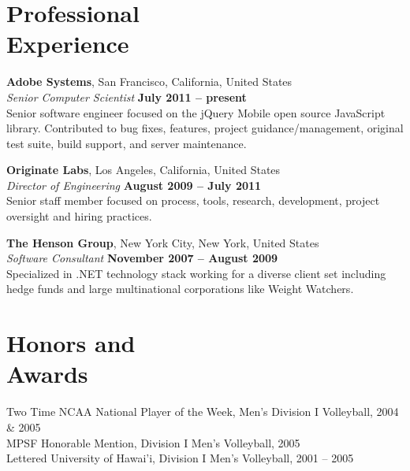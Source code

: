 \documentclass[margin,line]{resume}
\begin{document}
\begin{resume}
    \section{\mysidestyle Professional\\Experience}

    \textbf{Adobe Systems}, San Francisco, California, United States \vspace{2mm}\\\vspace{1mm}%
    \textsl{Senior Computer Scientist} \hfill \textbf{July 2011 -- present}\\
    Senior software engineer focused on the jQuery Mobile open source JavaScript library. Contributed to bug fixes, features, project guidance/management, original test suite, build support, and server maintenance.

    \textbf{Originate Labs}, Los Angeles, California, United States \vspace{2mm}\\\vspace{1mm}%
    \textsl{Director of Engineering} \hfill \textbf{August 2009 -- July 2011}\\
    Senior staff member focused on process, tools, research, development, project oversight and hiring practices.

    \textbf{The Henson Group}, New York City, New York, United States \vspace{2mm}\\\vspace{1mm}%
    \textsl{Software Consultant} \hfill \textbf{November 2007 -- August 2009}\\
    Specialized in .NET technology stack working for a diverse client set including hedge funds and large multinational corporations like Weight Watchers.

    \clearpage
    \section{\mysidestyle Honors and\\Awards}

    Two Time NCAA National Player of the Week, Men's Division I Volleyball, 2004 \& 2005
    \vspace{1mm}\\
    MPSF Honorable Mention, Division I Men's Volleyball, 2005
    \vspace{1mm}\\
    Lettered University of Hawai'i, Division I Men's Volleyball, 2001 -- 2005
    \vspace{1mm}\\


\end{resume}
\end{document}
